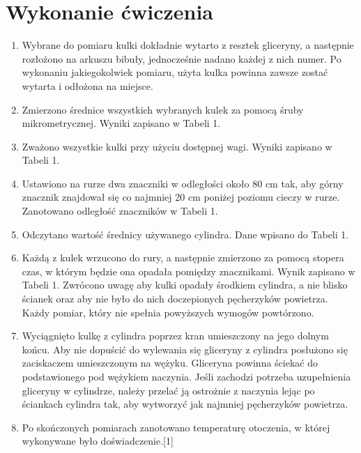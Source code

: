 \documentclass[12pt]{article}
\begin{document}
\section{Wykonanie ćwiczenia}

\begin{enumerate}
    \item Wybrane do pomiaru kulki dokładnie wytarto z resztek gliceryny, a następnie rozłożono na arkuszu bibuły, jednocześnie nadano każdej z nich numer. Po wykonaniu jakiegokolwiek pomiaru, użyta kulka powinna zawsze zostać wytarta i odłożona na miejsce.
    
    \item Zmierzono średnice wszystkich wybranych kulek za pomocą śruby mikrometrycznej. Wyniki zapisano w Tabeli 1.
    
    \item Zważono wszystkie kulki przy użyciu dostępnej wagi. Wyniki zapisano w Tabeli 1.
    
    \item Ustawiono na rurze dwa znaczniki w odległości około 80 cm tak, aby górny znacznik znajdował się co najmniej 20 cm poniżej poziomu cieczy w rurze. Zanotowano odległość znaczników w Tabeli 1.
    
    \item Odczytano wartość średnicy używanego cylindra. Dane wpisano do Tabeli 1.
    
    \item Każdą z kulek wrzucono do rury, a następnie zmierzono za pomocą stopera czas, w którym będzie ona opadała pomiędzy znacznikami. Wynik zapisano w Tabeli 1. Zwrócono uwagę aby kulki opadały środkiem cylindra, a nie blisko ścianek oraz aby nie było do nich doczepionych pęcherzyków powietrza. Każdy pomiar, który nie spełnia powyższych wymogów powtórzono.
    
    \item Wyciągnięto kulkę z cylindra poprzez kran umieszczony na jego dolnym końcu. Aby nie dopuścić do wylewania się gliceryny z cylindra posłużono się zaciskaczem umieszczonym na wężyku. Gliceryna powinna ściekać do podstawionego pod wężykiem naczynia. Jeśli zachodzi potrzeba uzupełnienia gliceryny w cylindrze, należy przelać ją ostrożnie z naczynia lejąc po ściankach cylindra tak, aby wytworzyć jak najmniej pęcherzyków powietrza.
    
    \item Po skończonych pomiarach zanotowano temperaturę otoczenia, w której wykonywane było doświadczenie.[1]
\end{enumerate}
\end{document}
